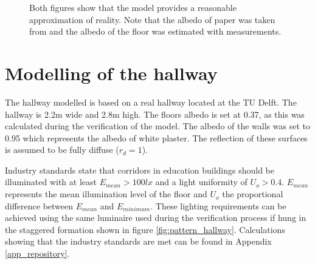\begin{figure}
	\centering     %
	\caption{Both figures show that the model provides a reasonable approximation of reality. Note that the albedo of paper was taken from \cite{Albedo} and the albedo of the floor was estimated with measurements.\label{fig:VerificationResults}}
\end{figure}

\section{Modelling of the hallway}
\label{sec:moddelingofthehallway}
The hallway modelled is based on a real hallway located at the TU Delft. The hallway is 2.2m wide and 2.8m high. The floors albedo is set at 0.37, as this was calculated during the verification of the model. The albedo of the walls was set to 0.95 which represents the albedo of white plaster\cite{Albedo}. The reflection of these surfaces is assumed to be fully diffuse ($r_d = 1$).

Industry standards state that corridors in education buildings should be illuminated with at least $E_{mean} > 100lx$ and a light uniformity of $U_o > 0.4$\cite{lichthandbuch}. $E_{mean}$ represents the mean illumination level of the floor and $U_o$ the proportional difference between $E_{mean}$ and $E_{minimum}$. These lighting requirements can be achieved using the same luminaire used during the verification process if hung in the staggered formation shown in figure \ref{fig:pattern_hallway}. Calculations showing that the industry standards are met can be found in Appendix \ref{app_repository}.

